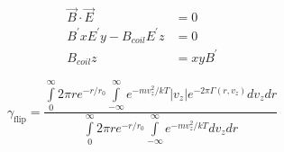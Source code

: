 \documentclass[%
 reprint,
 amsmath,amssymb,
 aps,
prl,
]{revtex4-1}
\begin{document}
\begin{eqnarray}
\vec{B}\cdot \vec{E} &= 0\\
B^\prime x E^\prime y - B_{coil}  E^\prime z &= 0\\
B_{coil}z &= xyB^\prime
\end{eqnarray}

\begin{equation}
\gamma_\text{flip}=\frac{\int\limits^\infty_0 2\pi r e^{-r/r_0} \int\limits^\infty_{-\infty} e^{-mv_z^2/kT} |v_z| e^{-2\pi\Gamma(r,v_z)}dv_zdr}{\int\limits^\infty_0 2\pi r e^{-r/r_0} \int\limits^\infty_{-\infty} e^{-mv_z^2/kT} dv_zdr}
\end{equation}

\nocite{*}

\end{document}
